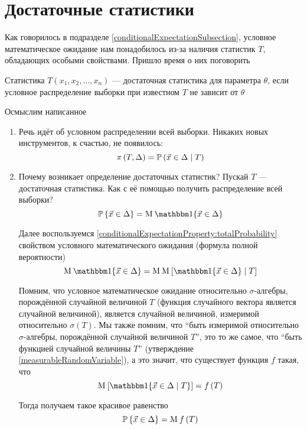 \section{Достаточные статистики}
Как говорилось в подразделе \ref{conditionalExpectationSubsection},
условное математическое ожидание нам понадобилось из-за наличия
статистик $T$, обладающих особыми свойствами.
Пришло время о них поговорить

\begin{definition}
    Статистика $T\left( x_1, x_2, \dots, x_n \right)$ --- достаточная статистика
    для параметра $\theta$, если условное распределение выборки
    при известном $T$ не зависит от $\theta$
\end{definition}

Осмыслим написанное
\begin{enumerate}
    \item Речь идёт об условном распределении всей выборки.
        Никаких новых инструментов, к счастью, не появилось:
        $$\pi\left( T, \Delta \right)
            = \mathbb{P}\left( \vec{x} \in \Delta \;\middle|\; T \right)$$
    \item Почему возникает определение достаточных статистик?
        Пускай $T$ --- достаточная статистика.
        Как с её помощью получить распределение всей выборки?
        $$\Probability{\vec{x} \in \Delta}
            = \mean{\Indicator{\vec{x} \in \Delta}}$$

        Далее воспользуемся
        \ref{conditionalExpectationProperty:totalProbability}
        свойством условного математического ожидания
        (формула полной вероятности)
        $$\mean{\Indicator{\vec{x} \in \Delta}}
            = \mean{\Mean{\Indicator{\vec{x} \in \Delta} \mcond T}}$$

        Помним, что условное математическое ожидание
        относительно $\sigma$-алгебры, порождённой случайной величиной $T$
        (функция случайного вектора является случайной величиной),
        является случайной величиной, измеримой
        относительно $\sigma\left( T \right)$.
        Мы также помним, что ``быть измеримой относительно $\sigma$-алгебры,
        порождённой случайной величиной $T$'', это то же самое, что
        ``быть функцией случайной величины $T$''
        (утверждение \ref{measurableRandomVariable}), а это значит,
        что существует функция $f$ такая, что
        $$\Mean{\Indicator{\vec{x} \in \Delta \mcond T}} = f\left( T \right)$$

        Тогда получаем такое красивое равенство
        $$\mathbb{P}\left\{ \vec{x} \in \Delta \right\} = \operatorname{M}_{} f\left( T \right)$$
\end{enumerate}

